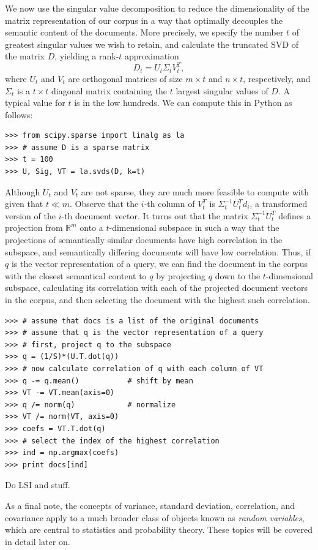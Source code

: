 We now use the singular value decomposition to reduce the dimensionality of the matrix representation of our
corpus in a way that optimally decouples the semantic content of the documents. 
More precisely, we specify the number $t$ of greatest singular values we wish to retain, and calculate the truncated SVD of the matrix $D$,
yielding a rank-$t$ approximation
\[
D_t = U_t\Sigma_tV_t^T,
\]
where $U_t$ and $V_t$ are orthogonal matrices of size $m \times t$ and $n \times t$, respectively, and $\Sigma_t$
is a $t \times t$ diagonal matrix containing the $t$ largest singular values of $D$. 
A typical value for $t$ is in the low hundreds.
We can compute this in Python as follows:
\begin{lstlisting}
>>> from scipy.sparse import linalg as la
>>> # assume D is a sparse matrix
>>> t = 100
>>> U, Sig, VT = la.svds(D, k=t)
\end{lstlisting}
Although $U_t$ and $V_t$ are not sparse, they are much more feasible to compute with given that $t \ll m$. 
Observe that the $i$-th column of $V_t^T$ is $\Sigma_t^{-1}U_t^Td_i$, a transformed version of the $i$-th document vector.
It turns out that the matrix $\Sigma_t^{-1}U_t^T$ defines a projection from $\mathbb{R}^m$ onto a $t$-dimensional subspace
in such a way that the projections of semantically similar documents have high correlation in the subspace, and
semantically differing documents will have low correlation. 
Thus, if $q$ is the vector representation of a query, we can find the document in the corpus with the closest semantical
content to $q$ by projecting $q$ down to the $t$-dimensional subspace, calculating its correlation with each of the 
projected document vectors in the corpus, and then selecting the document with the highest such correlation.

\begin{lstlisting}
>>> # assume that docs is a list of the original documents
>>> # assume that q is the vector representation of a query
>>> # first, project q to the subspace
>>> q = (1/S)*(U.T.dot(q))
>>> # now calculate correlation of q with each column of VT
>>> q -= q.mean()           # shift by mean
>>> VT -= VT.mean(axis=0)
>>> q /= norm(q)            # normalize
>>> VT /= norm(VT, axis=0)
>>> coefs = VT.T.dot(q)
>>> # select the index of the highest correlation
>>> ind = np.argmax(coefs)
>>> print docs[ind]
\end{lstlisting}
\begin{problem}
Do LSI and stuff.
\end{problem}

As a final note, the concepts of variance, standard deviation, correlation, and covariance apply to a much broader class of objects
known as \emph{random variables}, which are central to statistics and probability theory. These topics will be
covered in detail later on.
